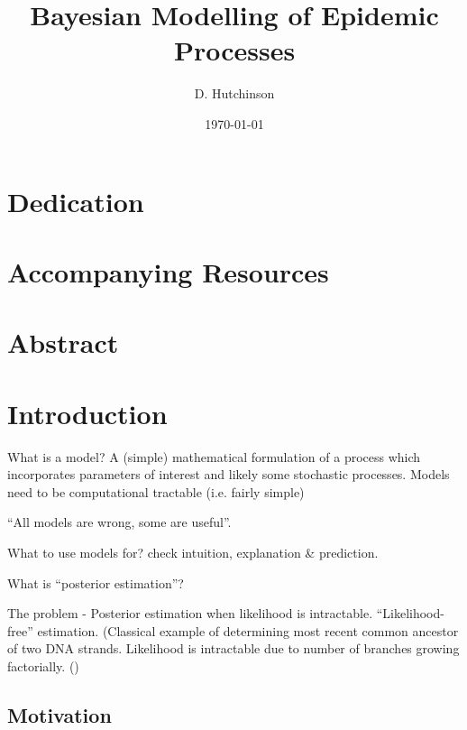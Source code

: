 \documentclass[bibliography=totoc,11pt,a4paper,margin=0]{article}
\theoremstyle{break}
\begin{document}
\title{Bayesian Modelling of Epidemic Processes}
\author{D. Hutchinson}
\date{\today}
\clearpage\maketitle
\thispagestyle{empty}
\newpage

\setcounter{page}{1}
\section*{Dedication}\label{sec_dedication}

\section*{Accompanying Resources}\label{sec_accompanying_resources}

\newpage
\section*{Abstract}\label{sec_abstract}

\newpage
\tableofcontents

\newpage
\section{Introduction}\label{sec_introduction}

  \par What is a model? A (simple) mathematical formulation of a process which incorporates parameters of interest and likely some stochastic processes. Models need to be computational tractable (i.e. fairly simple)
  \par ``All models are wrong, some are useful''.
  \par What to use models for? check intuition, explanation \& prediction.
  \par What is ``posterior estimation''?
  \par The problem - Posterior estimation when likelihood is intractable. ``Likelihood-free'' estimation. (Classical example of determining most recent common ancestor of two DNA strands. Likelihood is intractable due to number of branches growing factorially. (\cite[]{selecting_summary_stats_in_ABC_for_calibration})

\subsection*{Motivation}\label{sec_motivation}
\end{document}
